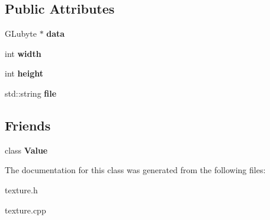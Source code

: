 \subsection*{Public Attributes}
\begin{DoxyCompactItemize}
\item 
\hypertarget{classg2c_1_1_texture2_d_ae0054c114f58b881bac49ae26a3e5c36}{
GLubyte $\ast$ {\bfseries data}}
\label{classg2c_1_1_texture2_d_ae0054c114f58b881bac49ae26a3e5c36}

\item 
\hypertarget{classg2c_1_1_texture2_d_a1055a22a350fbc3affcec5092068b4a7}{
int {\bfseries width}}
\label{classg2c_1_1_texture2_d_a1055a22a350fbc3affcec5092068b4a7}

\item 
\hypertarget{classg2c_1_1_texture2_d_a8a36ceb7d62906800782a0adf7aa2f61}{
int {\bfseries height}}
\label{classg2c_1_1_texture2_d_a8a36ceb7d62906800782a0adf7aa2f61}

\item 
\hypertarget{classg2c_1_1_texture2_d_a6ae225bcd225ef67d6fc2d7d7ac0697e}{
std::string {\bfseries file}}
\label{classg2c_1_1_texture2_d_a6ae225bcd225ef67d6fc2d7d7ac0697e}

\end{DoxyCompactItemize}
\subsection*{Friends}
\begin{DoxyCompactItemize}
\item 
\hypertarget{classg2c_1_1_texture2_d_aeceedf6e1a7d48a588516ce2b1983d6f}{
class {\bfseries Value}}
\label{classg2c_1_1_texture2_d_aeceedf6e1a7d48a588516ce2b1983d6f}

\end{DoxyCompactItemize}


The documentation for this class was generated from the following files:\begin{DoxyCompactItemize}
\item 
texture.h\item 
texture.cpp\end{DoxyCompactItemize}
